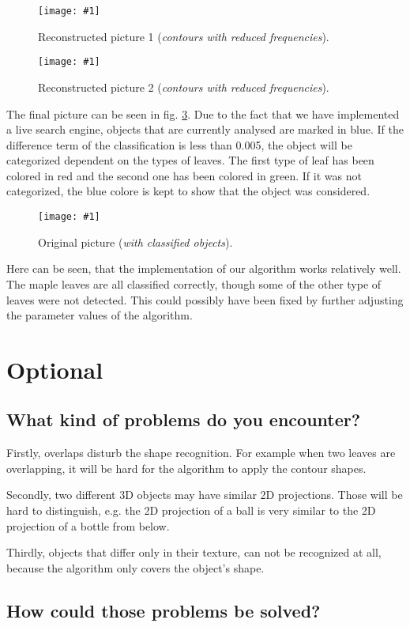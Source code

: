 \documentclass[a4paper,headings=small]{scrartcl}
\numberwithin{equation}{section} %
\numberwithin{figure}{section}   %
\newcommand{\image}[3]{
	\begin{figure}[htbp]
		\centering
		\texttt{[image: \#1]}
		\caption{#3}
		\label{fig:#1}
	\end{figure}
}
\newcommand{\generatedImgRoot}{../../../target}
\newcommand{\dDetectionThreshold}{0.005}
\begin{document}
\image{\generatedImgRoot/pic_FourierDescriptor1}{0.3}{%
		Reconstructed picture 1 (\emph{contours with reduced frequencies}).}
\image{\generatedImgRoot/pic_FourierDescriptor2}{0.5}{%
		Reconstructed picture 2 (\emph{contours with reduced frequencies}).}
\newpage
The final picture can be seen in fig. \ref{fig:\generatedImgRoot/pic_final}.
Due to the fact that we have implemented a live search engine,
objects that are currently analysed are marked in blue.
If the difference term of the classification is less than \dDetectionThreshold{},
the object will be categorized dependent on the types of leaves.
The first type of leaf has been colored in red 
and the second one has been colored in green.
If it was not categorized, the blue colore is kept to show that the object was considered.

\image{\generatedImgRoot/pic_final}{0.9}{%
		Original picture (\emph{with classified objects}).} 

Here can be seen, that the implementation of our algorithm works relatively well.
The maple leaves are all classified correctly,
though some of the other type of leaves were not detected.
This could possibly have been fixed by further adjusting the parameter values
of the algorithm.

\newpage


\section{Optional}

\subsection{What kind of problems do you encounter?}

Firstly, overlaps disturb the shape recognition.
For example when two leaves are overlapping,
it will be hard for the algorithm to apply the contour shapes.

Secondly, two different 3D objects may have similar 2D projections.
Those will be hard to distinguish,
e.g. the 2D projection of a ball is very similar to the 2D projection of a bottle from below.

Thirdly, objects that differ only in their texture, can not be recognized at all, 
because the algorithm only covers the object's shape.

\subsection{How could those problems be solved?}
\end{document}
